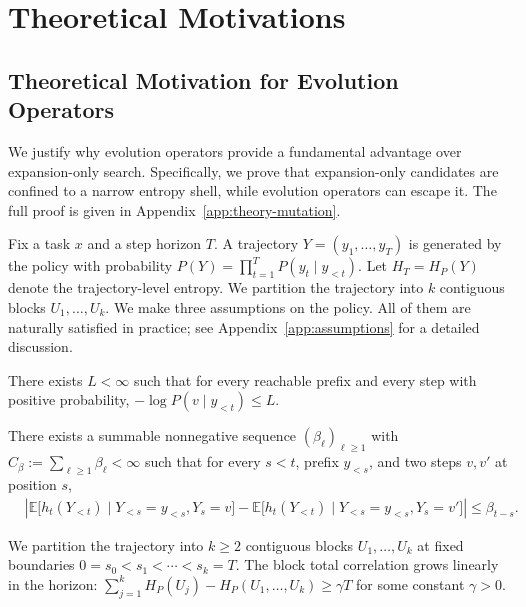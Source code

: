 \section{Theoretical Motivations}

\subsection{Theoretical Motivation for Evolution Operators}
\label{sec:theory-mutation}

We justify why evolution operators provide a fundamental advantage over expansion-only search. Specifically, we prove that expansion-only candidates are confined to a narrow entropy shell, while evolution operators can escape it. The full proof is given in Appendix~\ref{app:theory-mutation}.

Fix a task $x$ and a step horizon $T$. A trajectory $Y = (y_1, \dots, y_T)$ is generated by the policy with probability $P(Y) = \prod_{t=1}^T P(y_t \mid y_{<t})$. Let $H_T = H_P(Y)$ denote the trajectory-level entropy. We partition the trajectory into $k$ contiguous blocks $U_1, \dots, U_k$. We make three assumptions on the policy. All of them are naturally satisfied in practice; see Appendix~\ref{app:assumptions} for a detailed discussion.

\begin{assumption}
\label{assump:bounded}
There exists $L<\infty$ such that for every reachable prefix and every step with positive probability, $-\log P(v\mid y_{<t})\le L$.
\end{assumption}

\begin{assumption}
\label{assump:decay}
There exists a summable nonnegative sequence $(\beta_\ell)_{\ell\ge1}$ with
$C_\beta:=\sum_{\ell\ge1}\beta_\ell<\infty$ such that for every $s<t$,
prefix $y_{<s}$, and two steps $v,v'$ at position $s$,
\begin{align}
&\left|
\mathbb{E}\!\big[h_t(Y_{<t})\mid Y_{<s}=y_{<s},Y_s=v\big]
-
\mathbb{E}\!\big[h_t(Y_{<t})\mid Y_{<s}=y_{<s},Y_s=v'\big]
\right|
\le \beta_{t-s}.
\end{align}
\end{assumption}

\begin{assumption}
\label{assump:tc}
We partition the trajectory into $k \geq 2$ contiguous blocks $U_1, \dots, U_k$ at fixed boundaries $0 = s_0 < s_1 < \cdots < s_k = T$. The block total correlation grows linearly in the horizon:
$\sum_{j=1}^k H_P(U_j) - H_P(U_1, \ldots, U_k) \geq \gamma T$
for some constant $\gamma > 0$.  
\end{assumption}

